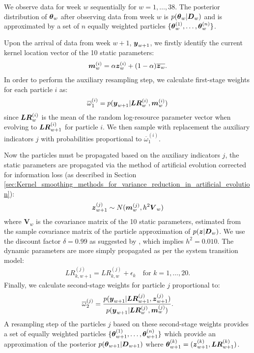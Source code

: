 We observe data for week \(w\) sequentially for \(w = 1, \ldots, 38\). The posterior distribution of \(\boldsymbol{\theta}_w\)
after observing data from week \(w\) is \(p(\boldsymbol{\theta}_w | \boldsymbol{D}_w)\) and is approximated by a set of \(n\) equally
weighted particles \(\{\boldsymbol{\theta}_w^{(1)}, \ldots, \boldsymbol{\theta}_w^{(n)}\}\).

Upon the arrival of data from week \(w+1\), \(\boldsymbol{y}_{w+1}\), we firstly identify the current kernel location vector of
the 10 static parameters:
\begin{align}
\boldsymbol{m}_w^{(i)} = \alpha \boldsymbol{z}_w^{(i)} + (1 - \alpha) \overline{\boldsymbol{z}_w}.
\end{align}
In order to perform the auxiliary resampling step, we calculate first-stage weights for each particle \(i\) as:
\begin{align}
\overline{\omega}^{(i)}_1 = p(\boldsymbol{y}_{w+1} | \boldsymbol{LR}_w^{(i)}, \boldsymbol{m}_w^{(i)})
\end{align}
since \(\boldsymbol{LR}_w^{(i)}\) is the mean of the random log-resource parameter vector when evolving to
\(\boldsymbol{LR}_{w+1}^{(i)}\) for particle \(i\). We then sample with replacement the auxiliary indicators \(j\) with
probabilities proportional to \(\overline{\omega}^{(i)}_1\). 

Now the particles must be propagated based on the auxiliary indicators \(j\), the static parameters are propagated
via the method of artificial evolution corrected for information loss (as described in Section
\ref{sec:Kernel_smoothing_methods_for_variance_reduction_in_artificial_evolution}):
\begin{align}
\boldsymbol{z}_{w + 1}^{(j)} \sim N(\boldsymbol{m}_w^{(j)}, h^2 \boldsymbol{V}_w) 
\end{align}
where \(\boldsymbol{V}_w\) is the covariance matrix of the 10 static parameters, estimated from the sample covariance
matrix of the particle approximation of \(p(\boldsymbol{z} | \boldsymbol{D}_w)\). We use the discount factor \(\delta = 0.99\) as
suggested by \cite{liu2001}, which implies \(h^2 = 0.010\). The dynamic parameters are more simply propagated as per
the system transition model:
\begin{align}
LR_{k, w+1}^{(j)} = LR_{k, w}^{(j)} + \epsilon_k \quad \text{for \(k = 1, \ldots, 20\)}.
\end{align}
Finally, we calculate second-stage weights for particle \(j\) proportional to:
\begin{align}
\overline{\omega}^{(j)}_2 = \frac{p(\boldsymbol{y}_{w+1} | \boldsymbol{LR}_{w+1}^{(j)}, \boldsymbol{z}_{w+1}^{(j)})}
                                 {p(\boldsymbol{y}_{w+1} | \boldsymbol{LR}_w^{(j)}, \boldsymbol{m}_w^{(j)})}.
\end{align}
A resampling step of the particles \(j\) based on these second-stage weights provides a set of equally weighted
particles \(\{\boldsymbol{\theta}_{w+1}^{(1)}, \ldots, \boldsymbol{\theta}_{w+1}^{(n)}\}\) which provide an approximation of the posterior
\(p(\boldsymbol{\theta}_{w+1} | \boldsymbol{D}_{w+1})\) where \(\boldsymbol{\theta}_{w+1}^{(k)} = (\boldsymbol{z}_{w + 1}^{(k)}, \boldsymbol{LR}_{w+1}^{(k)})\).

